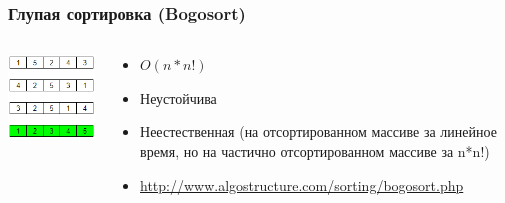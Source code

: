 \documentclass[xetex,mathserif,serif]{beamer}
\begin{document}
	\begin{frame}
		\frametitle{Глупая сортировка (Bogosort)}
		\begin{columns}
			\begin{column}{0.25\textwidth}
				\includegraphics[width=\textwidth]{bogosort.png}
			\end{column}
			\begin{column}{0.75\textwidth}
				\begin{itemize}
					\item $O(n*n!)$
					\item Неустойчива
					\item Неестественная (на отсортированном массиве за линейное время, но на частично отсортированном массиве за n*n!)
					\item \url{http://www.algostructure.com/sorting/bogosort.php}
				\end{itemize}
			\end{column}
		\end{columns}
	\end{frame}
\end{document}
